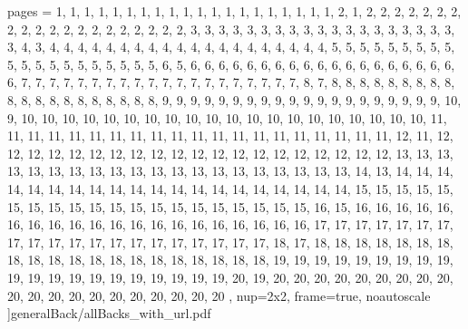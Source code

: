 \documentclass[letterpaper]{article}
\begin{document}

	pages = 	{
											1,	1,	1,	1,	1,	1,	1,	1,	1,	1,	1,	1,	1,	1,	1,	1,	1,	1,	1,	1,
											2,	1,	
											2,	2,	2,	2,	2,	2,	2,	2,	2,	2,	2,	2,	2,	2,	2,	2,	2,	2,	2,	2,
											3,	3,	3,	3,	3,	3,	3,	3,	3,	3,	3,	3,	3,	3,	3,	3,	3,	3,	3,	3,
											4,	3,	
											4,	4,	4,	4,	4,	4,	4,	4,	4,	4,	4,	4,	4,	4,	4,	4,	4,	4,	4,	4,
											5,	5,	5,	5,	5,	5,	5,	5,	5,	5,	5,	5,	5,	5,	5,	5,	5,	5,	5,	5,
											6,	5,
											6,	6,	6,	6,	6,	6,	6,	6,	6,	6,	6,	6,	6,	6,	6,	6,	6,	6,	6,	6,
											7,	7,	7,	7,	7,	7,	7,	7,	7,	7,	7,	7,	7,	7,	7,	7,	7,	7,	7,	7,
											8,	7,	
											8,	8,	8,	8,	8,	8,	8,	8,	8,	8,	8,	8,	8,	8,	8,	8,	8,	8,	8,	8,
											9,	9,	9,	9,	9,	9,	9,	9,	9,	9,	9,	9,	9,	9,	9,	9,	9,	9,	9,	9,
											10, 9,
											10,	10,	10,	10,	10,	10,	10,	10,	10,	10,	10,	10,	10,	10,	10,	10,	10,	10,	10,	10,
											11,	11,	11,	11,	11,	11,	11,	11,	11,	11,	11,	11,	11,	11,	11,	11,	11,	11,	11,	11,
											12,	11,
											12,	12,	12,	12,	12,	12,	12,	12,	12,	12,	12,	12,	12,	12,	12,	12,	12,	12,	12,	12,
											13,	13,	13,	13,	13,	13,	13,	13,	13,	13,	13,	13,	13,	13,	13,	13,	13,	13,	13,	13,
											14, 	13,
											14,	14,	14,	14,	14,	14,	14,	14,	14,	14,	14,	14,	14,	14,	14,	14,	14,	14,	14,	14,
											15,	15,	15,	15,	15,	15,	15,	15,	15,	15,	15,	15,	15,	15,	15,	15,	15,	15,	15,	15,
											16,	15,
											16,	16,	16,	16,	16,	16,	16,	16,	16,	16,	16,	16,	16,	16,	16,	16,	16,	16,	16,	16,
											17,	17,	17,	17,	17,	17,	17,	17,	17,	17,	17,	17,	17,	17,	17,	17,	17,	17,	17,	17,
											18,	17,
											18,	18,	18,	18,	18,	18,	18,	18,	18,	18,	18,	18,	18,	18,	18,	18,	18,	18,	18,	18,
											19,	19,	19,	19,	19,	19,	19,	19,	19,	19,	19,	19,	19,	19,	19,	19,	19,	19,	19,	19,
											20,	19,
											20,	20,	20,	20,	20,	20,	20,	20,	20,	20,	20,	20,	20,	20,	20,	20,	20,	20,	20,	20
										},
						nup=2x2,
						frame=true,
						noautoscale
					]{generalBack/allBacks_with_url.pdf}
\end{document}
